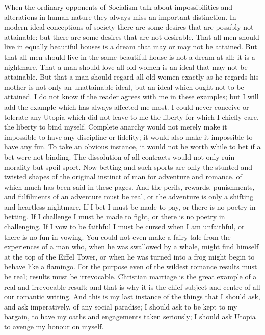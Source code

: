 When the ordinary opponents of Socialism talk about impossibilities and alterations in human nature they always miss an important distinction. In modern ideal conceptions of society there are some desires that are possibly not attainable: but there are some desires that are not desirable. That all men should live in equally beautiful houses is a dream that may or may not be attained. But that all men should live in the same beautiful house is not a dream at all; it is a nightmare. That a man should love all old women is an ideal that may not be attainable. But that a man should regard all old women exactly as he regards his mother is not only an unattainable ideal, but an ideal which ought not to be attained. I do not know if the reader agrees with me in these examples; but I will add the example which has always affected me most. I could never conceive or tolerate any Utopia which did not leave to me the liberty for which I chiefly care, the liberty to bind myself. Complete anarchy would not merely make it impossible to have any discipline or fidelity; it would also make it impossible to have any fun. To take an obvious instance, it would not be worth while to bet if a bet were not binding. The dissolution of all contracts would not only ruin morality but spoil sport. Now betting and such sports are only the stunted and twisted shapes of the original instinct of man for adventure and romance, of which much has been said in these pages. And the perils, rewards, punishments, and fulfilments of an adventure must be real, or the adventure is only a shifting and heartless nightmare. If I bet I must be made to pay, or there is no poetry in betting. If I challenge I must be made to fight, or there is no poetry in challenging. If I vow to be faithful I must be cursed when I am unfaithful, or there is no fun in vowing. You could not even make a fairy tale from the experiences of a man who, when he was swallowed by a whale, might find himself at the top of the Eiffel Tower, or when he was turned into a frog might begin to behave like a flamingo. For the purpose even of the wildest romance results must be real; results must be irrevocable. Christian marriage is the great example of a real and irrevocable result; and that is why it is the chief subject and centre of all our romantic writing. And this is my last instance of the things that I should ask, and ask imperatively, of any social paradise; I should ask to be kept to my bargain, to have my oaths and engagements taken seriously; I should ask Utopia to avenge my honour on myself.

